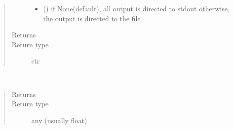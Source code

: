 \documentclass[letterpaper,10pt,english]{sphinxmanual}
\begin{document}
\begin{fulllineitems}
\begin{fulllineitems}
\begin{quote}
\begin{description}
\begin{itemize}
\item {} 
 () \textendash{} if None(default), all output is directed to stdout 
otherwise, the output is directed to the file

\end{itemize}

\item[{Returns}] \leavevmode
{}

\item[{Return type}] \leavevmode
str

\end{description}\end{quote}

\end{fulllineitems}


\begin{fulllineitems}
\label{\detokenize{Reference:salabim.Pdf.sample}}~\begin{quote}\begin{description}
\item[{Returns}] \leavevmode
{}

\item[{Return type}] \leavevmode
any (usually float)

\end{description}\end{quote}

\end{fulllineitems}


\end{fulllineitems}

\end{document}

